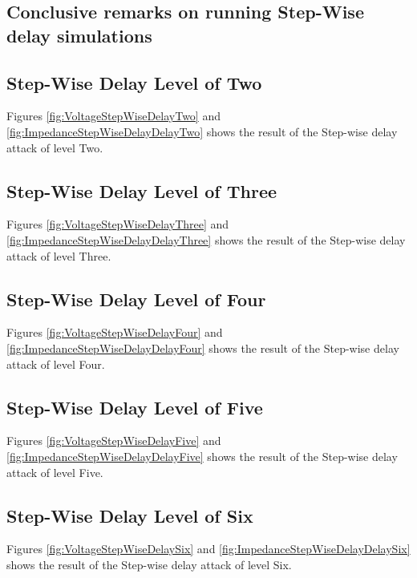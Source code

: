 

\newpage
\subsection{Conclusive remarks on running Step-Wise delay simulations}

\subsection{Step-Wise Delay Level of Two}
Figures \ref{fig:VoltageStepWiseDelayTwo} and \ref{fig:ImpedanceStepWiseDelayDelayTwo} shows the result of the Step-wise delay attack of level Two.
\subsection{Step-Wise Delay Level of Three}
Figures \ref{fig:VoltageStepWiseDelayThree} and \ref{fig:ImpedanceStepWiseDelayDelayThree} shows the result of the Step-wise delay attack of level Three.

\subsection{Step-Wise Delay Level of Four}
Figures \ref{fig:VoltageStepWiseDelayFour} and \ref{fig:ImpedanceStepWiseDelayDelayFour} shows the result of the Step-wise delay attack of level Four.

\subsection{Step-Wise Delay Level of Five}
Figures \ref{fig:VoltageStepWiseDelayFive} and \ref{fig:ImpedanceStepWiseDelayDelayFive} shows the result of the Step-wise delay attack of level Five.

\subsection{Step-Wise Delay Level of Six}
Figures \ref{fig:VoltageStepWiseDelaySix} and \ref{fig:ImpedanceStepWiseDelayDelaySix} shows the result of the Step-wise delay attack of level Six.



